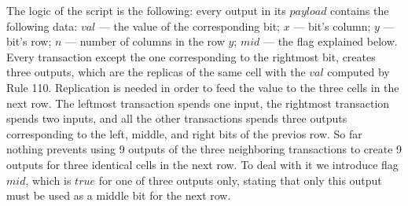 The logic of the script is the following: every output in its $payload$
contains the following data: $val$ --- the value of the corresponding bit;
$x$ --- bit's column; $y$ --- bit's row; $n$ --- number of columns in the row
$y$; $mid$ --- the flag explained below. Every transaction except the one
corresponding to the rightmost bit, creates three
outputs, which are the replicas of the same cell with the $val$ computed by Rule
110. Replication is needed in order
to feed the value to the three cells in the next row. The leftmost transaction
spends one input, the rightmost transaction spends two inputs, and all the other transactions
spends three outputs corresponding to the left, middle, and right bits of the
previos row. So far nothing prevents using 9 outputs of the three neighboring
transactions to create 9 outputs for three identical cells in the next row. To
deal with it we introduce flag $mid$, which is $true$ for one of three outputs
only, stating that only this output must be used as a middle bit for the next
row.

